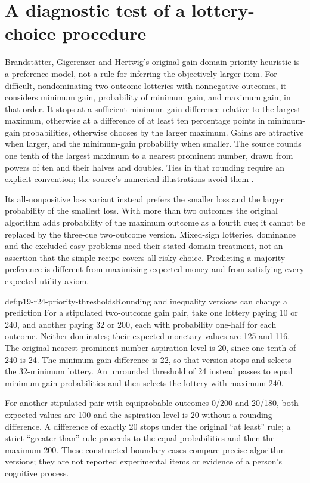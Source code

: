 \section{A diagnostic test of a lottery-choice procedure}
\label{sec:p19-r24-priority}

Brandst\"atter, Gigerenzer and Hertwig's original gain-domain
priority heuristic is a preference model, not a rule for inferring
the objectively larger item. For difficult, nondominating
two-outcome lotteries with nonnegative outcomes, it considers
minimum gain, probability of minimum gain, and maximum gain,
in that order. It stops at a sufficient minimum-gain difference
relative to the largest maximum, otherwise at a difference of
at least ten percentage points in minimum-gain probabilities,
otherwise chooses by the larger maximum. Gains are attractive
when larger, and the minimum-gain probability when smaller.
The source rounds one tenth of the largest maximum to a nearest
prominent number, drawn from powers of ten and their halves and
doubles. Ties in that rounding require an explicit convention;
the source's numerical illustrations avoid them
\cite[pp.~412--414]{BrandstaetterGigerenzerHertwig2006Priority}.

Its all-nonpositive loss variant instead prefers the smaller loss
and the larger probability of the smallest loss. With more than
two outcomes the original algorithm adds probability of the
maximum outcome as a fourth cue; it cannot be replaced by the
three-cue two-outcome version. Mixed-sign lotteries, dominance
and the excluded easy problems need their stated domain treatment,
not an assertion that the simple recipe covers all risky choice.
Predicting a majority preference is different from maximizing
expected money and from satisfying every expected-utility axiom.

\begin{hbexample}{def:p19-r24-priority-thresholds}{Rounding and inequality versions can change a prediction}
For a stipulated two-outcome gain pair, take one lottery paying 10 or
240, and another paying 32 or 200, each with probability one-half for
each outcome. Neither dominates; their expected monetary values are
125 and 116. The original nearest-prominent-number aspiration level
is 20, since one tenth of 240 is 24. The minimum-gain difference is
22, so that version stops and selects the 32-minimum lottery. An
unrounded threshold of 24 instead passes to equal minimum-gain
probabilities and then selects the lottery with maximum 240.

For another stipulated pair with equiprobable outcomes 0/200 and
20/180, both expected values are 100 and the aspiration level is 20
without a rounding difference. A difference of exactly 20 stops under
the original ``at least'' rule; a strict ``greater than'' rule proceeds
to the equal probabilities and then the maximum 200. These constructed
boundary cases compare precise algorithm versions; they are not
reported experimental items or evidence of a person's cognitive process.
\end{hbexample}

